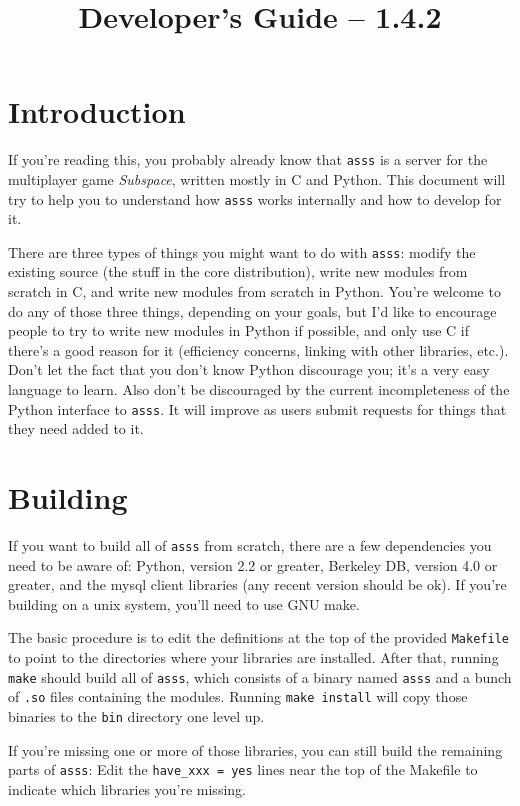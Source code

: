 \documentclass{article}
\title{\asss{} Developer's Guide -- 1.4.2}
\newcommand{\asss}{\texttt{asss}}
\begin{document}
\maketitle

\section{Introduction}

If you're reading this, you probably already know that \asss{} is a
server for the multiplayer game \emph{Subspace}, written mostly in C and
Python. This document will try to help you to understand how \asss{}
works internally and how to develop for it.

There are three types of things you might want to do with \asss{}:
modify the existing source (the stuff in the core distribution), write
new modules from scratch in C, and write new modules from scratch in
Python. You're welcome to do any of those three things, depending on
your goals, but I'd like to encourage people to try to write new modules
in Python if possible, and only use C if there's a good reason for it
(efficiency concerns, linking with other libraries, etc.). Don't let the
fact that you don't know Python discourage you; it's a very easy
language to learn. Also don't be discouraged by the current
incompleteness of the Python interface to \asss{}. It will improve as
users submit requests for things that they need added to it.


\section{Building}

If you want to build all of \asss{} from scratch, there are a few
dependencies you need to be aware of: Python, version 2.2 or greater,
Berkeley DB, version 4.0 or greater, and the mysql client libraries (any
recent version should be ok). If you're building on a unix system,
you'll need to use GNU make.

The basic procedure is to edit the definitions at the top of the
provided \verb/Makefile/ to point to the directories where your
libraries are installed. After that, running \verb/make/ should build
all of \asss{}, which consists of a binary named \verb/asss/ and a bunch
of \verb/.so/ files containing the modules. Running \verb/make install/
will copy those binaries to the \verb/bin/ directory one level up.

If you're missing one or more of those libraries, you can still build
the remaining parts of \asss{}: Edit the \verb/have_xxx = yes/ lines
near the top of the Makefile to indicate which libraries you're missing.
\end{document}
